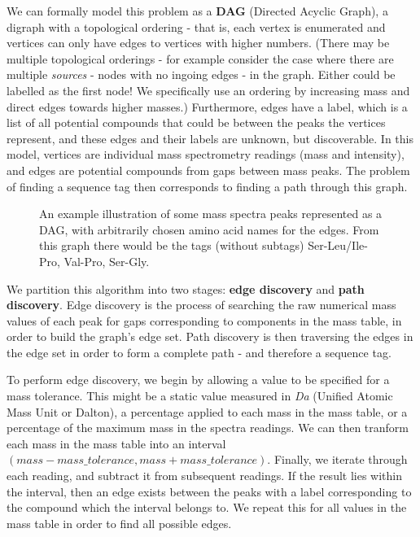 \documentclass{l4proj}
\newcommand{\cit}[1]{\citep{#1}}
\begin{document}
We can formally model this problem as a \textbf{DAG} (Directed Acyclic Graph), a digraph with a topological ordering - that is, each vertex is enumerated and vertices can only have edges to vertices with higher numbers.  (There may be multiple topological orderings - for example consider the case where there are multiple \textit{sources} - nodes with no ingoing edges - in the graph. Either could be labelled as the first node! We specifically use an ordering by increasing mass and direct edges towards higher masses.) Furthermore, edges have a label, which is a list of all potential compounds that could be between the peaks the vertices represent, and these edges and their labels are unknown, but discoverable. In this model, vertices are individual mass spectrometry readings (mass and intensity), and edges are potential compounds from gaps between mass peaks. The problem of finding a sequence tag then corresponds to finding a path through this graph. \cit{msbook}

\begin{figure}
    \centering

    \caption{An example illustration of some mass spectra peaks represented as a DAG, with arbitrarily chosen amino acid names for the edges. From this 	    graph there would be the tags (without subtags) Ser-Leu/Ile-Pro, Val-Pro, Ser-Gly.
    }

    \label{fig:peak_graph}
\end{figure}

We partition this algorithm into two stages: \textbf{edge discovery} and \textbf{path discovery}. Edge discovery is the process of searching the raw numerical mass values of each peak for gaps corresponding to components in the mass table, in order to build the graph's edge set. Path discovery is then traversing the edges in the edge set in order to form a complete path - and therefore a sequence tag.

To perform edge discovery, we begin by allowing a value to be specified for a mass tolerance. This might be a static value measured in \textit{Da} (Unified Atomic Mass Unit or Dalton), a percentage applied to each mass in the mass table, or a percentage of the maximum mass in the spectra readings. We can then tranform each mass in the mass table into an interval \((mass - mass\_tolerance, mass + mass\_tolerance)\). Finally, we iterate through each reading, and subtract it from subsequent readings. If the result lies within the interval, then an edge exists between the peaks with a label corresponding to the compound which the interval belongs to. We repeat this for all values in the mass table in order to find all possible edges.
\end{document}
